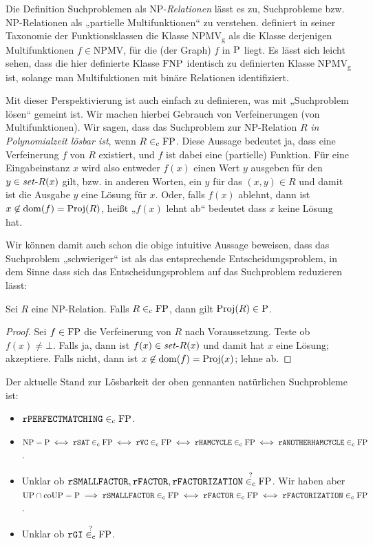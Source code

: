 Die Definition Suchproblemen als NP-\emph{Relationen} lässt es zu, Suchprobleme bzw. NP-Relationen als „partielle Multifunktionen“ zu verstehen.
\textcite{selman_taxonomy_1994} definiert in seiner Taxonomie der Funktionsklassen die Klasse $\mathrm{NPMV_g}$ als die Klasse derjenigen Multifunktionen $f\in\mathrm{NPMV}$, für die (der Graph) $f$ in $\P$ liegt.
Es lässt sich leicht sehen, dass die hier definierte Klasse $\FNP$ identisch zu \citeauthor{selman_taxonomy_1994} definierten Klasse $\mathrm{NPMV_g}$ ist, solange man Multifuktionen mit binäre Relationen identifiziert.

Mit dieser Perspektivierung ist auch einfach zu definieren, was mit „Suchproblem lösen“ gemeint ist. Wir machen hierbei Gebrauch von Verfeinerungen (von Multifunktionen).
Wir sagen, dass das Suchproblem zur NP-Relation $R$ \emph{in Polynomialzeit lösbar ist}, wenn $R\inc \mathrm{FP}$.
Diese Aussage bedeutet ja, dass eine Verfeinerung $f$ von $R$ existiert, und $f$ ist dabei eine (partielle) Funktion.
Für eine Eingabeinstanz $x$ wird also entweder $f(x)$ einen Wert $y$ ausgeben für den $y\in\fset{}R(x)$ gilt, bzw. in anderen Worten, ein $y$ für das $(x,y)\in R$ und damit ist die Ausgabe $y$ eine Lösung für $x$.
Oder, falls $f(x)$ ablehnt, dann ist $x\not\in\dom(f)=\Proj(R)$, heißt „$f(x)$ lehnt ab“ bedeutet dass $x$ keine Lösung hat.

Wir können damit auch schon die obige intuitive Aussage beweisen, dass das Suchproblem „schwieriger“ ist als das entsprechende Entscheidungsproblem, in dem Sinne dass sich das Entscheidungsproblem auf das Suchproblem reduzieren lässt:
\begin{observation}\label{obs:search-stronger-than-decision}
    Sei $R$ eine NP-Relation. Falls $R\inc\FP$, dann gilt $\Proj(R)\in\P$.
\end{observation}
\begin{proof}
    Sei $f\in\FP$ die Verfeinerung von $R$ nach Voraussetzung. Teste ob $f(x)\neq \bot$. Falls ja, dann ist $f(x)\in\fset{R}(x)$ und damit hat $x$ eine Lösung; akzeptiere. Falls nicht, dann ist $x\not\in\dom(f)=\Proj(x)$; lehne ab.
\end{proof}

Der aktuelle Stand zur Lösbarkeit der oben gennanten natürlichen Suchprobleme ist:
\begin{itemize}\raggedright
    \item $\mathtt{rPERFECTMATCHING}\inc\FP$.
    \item $\NP=\P \iff \mathtt{rSAT}\inc\FP \iff \mathtt{rVC}\inc\FP \iff \mathtt{rHAMCYCLE}\inc\FP \iff \mathtt{rANOTHERHAMCYCLE}\inc\FP$.
    \item Unklar ob $\mathtt{rSMALLFACTOR}, \mathtt{rFACTOR}, \mathtt{rFACTORIZATION}\stackrel{?}{\inc}\FP$. Wir haben aber $\UP\cap\coUP=\P \implies \mathtt{rSMALLFACTOR}\inc \FP \iff \mathtt{rFACTOR}\inc\FP \iff \mathtt{rFACTORIZATION}\inc\FP$.
    \item Unklar ob $\mathtt{rGI}\stackrel{?}{\inc}{\FP}$.
\end{itemize}

